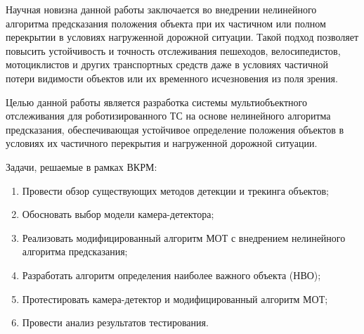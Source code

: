 Научная новизна данной работы заключается во внедрении нелинейного алгоритма предсказания положения объекта при их частичном или полном перекрытии в условиях нагруженной дорожной ситуации. Такой подход позволяет повысить устойчивость и точность отслеживания пешеходов, велосипедистов, мотоциклистов и других транспортных средств даже в условиях частичной потери видимости объектов или их временного исчезновения из поля зрения.

Целью данной работы является разработка системы мультиобъектного отслеживания для роботизированного ТС на основе нелинейного алгоритма предсказания, обеспечивающая устойчивое определение положения объектов в условиях их частичного перекрытия и нагруженной дорожной ситуации. 

Задачи, решаемые в рамках ВКРМ:

\begin{enumerate}
    \item Провести обзор существующих методов детекции и трекинга объектов;
    \item Обосновать выбор модели камера-детектора;
    \item Реализовать модифицированный алгоритм МОТ с внедрением нелинейного алгоритма предсказания;
    \item Разработать алгоритм определения наиболее важного объекта (НВО);
    \item Протестировать камера-детектор и модифицированный алгоритм МОТ;
    \item Провести анализ результатов тестирования.
\end{enumerate}
